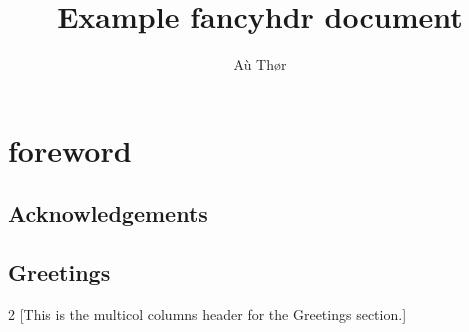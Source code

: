 \documentclass[twoside]{book}
\title{Example fancyhdr document}
\author{A\`{u} Th\o r}
\begin{document}
\frontmatter
\maketitle

\chapter{foreword}

\section{Acknowledgements}
\Blindtext

\section{Greetings}
\begin{multicols}{2}
[This is the multicol columns header for the Greetings section.]
\Blindtext
\end{multicols}

\tableofcontents

\mainmatter

\Blinddocument
\end{document}
